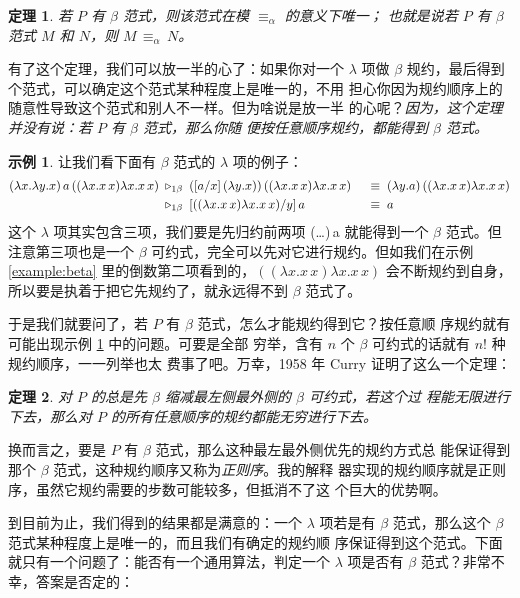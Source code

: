 \documentclass[a4paper,adobefonts]{ctexart}
\newtheorem{theorem}{定理}
\theoremstyle{definition}
\newtheorem{example}{示例}
\begin{document}
\begin{theorem}
  若 $P$ 有 $\beta$ 范式，则该范式在模 $\equiv_\alpha$ 的意义下唯一；
  也就是说若 $P$ 有 $\beta$ 范式 $M$ 和 $N$，则 $M\,\equiv_\alpha\,N$。
\end{theorem}

有了这个定理，我们可以放一半的心了：如果你对一个 $\lambda$ 项做
$\beta$ 规约，最后得到个范式，可以确定这个范式某种程度上是唯一的，不用
担心你因为规约顺序上的随意性导致这个范式和别人不一样。但为啥说是放一半
的心呢？\emph{因为，这个定理并没有说：若 $P$ 有 $\beta$ 范式，那么你随
  便按任意顺序规约，都能得到 $\beta$ 范式。}

\begin{example}\label{example:diffdiverge}
  让我们看下面有 $\beta$ 范式的 $\lambda$ 项的例子：
  \begin{alignat*}{2}
    (\lambda x.\lambda y. x)\,a\,((\lambda x.x\,x)\lambda x.x\,x)\; &\triangleright_{1\beta}\;
    ([a/x]\,(\lambda y.x))\,((\lambda x.x\,x)\lambda x.x\,x) &\; &\equiv\; (\lambda y.a)\,((\lambda x.x\,x)\lambda x.x\,x)\\
    &\triangleright_{1\beta}\; [((\lambda x.x\,x)\lambda x.x\,x)/y]\,a & &\equiv\; a
  \end{alignat*}
  这个 $\lambda$ 项其实包含三项，我们要是先归约前两项
  (\lambda\dots)\,a 就能得到一个 $\beta$ 范式。但注意第三项也是一个
  $\beta$ 可约式，完全可以先对它进行规约。但如我们在示例
  \ref{example:beta} 里的倒数第二项看到的，$((\lambda x.x\,x)\lambda
  x.x\,x)$ 会不断规约到自身，所以要是执着于把它先规约了，就永远得不到
  $\beta$ 范式了。
\end{example}

于是我们就要问了，若 $P$ 有 $\beta$ 范式，怎么才能规约得到它？按任意顺
序规约就有可能出现示例 \ref{example:diffdiverge} 中的问题。可要是全部
穷举，含有 $n$ 个 $\beta$ 可约式的话就有 $n!$ 种规约顺序，一一列举也太
费事了吧。万幸，1958 年 Curry 证明了这么一个定理：

\begin{theorem}
  对 $P$ 的总是先 $\beta$ 缩减最左侧最外侧的 $\beta$ 可约式，若这个过
  程能无限进行下去，那么对 $P$ 的所有任意顺序的规约都能无穷进行下去。
\end{theorem}

换而言之，要是 $P$ 有 $\beta$ 范式，那么这种最左最外侧优先的规约方式总
能保证得到那个 $\beta$ 范式，这种规约顺序又称为\emph{正则序}。我的解释
器实现的规约顺序就是正则序，虽然它规约需要的步数可能较多，但抵消不了这
个巨大的优势啊。

到目前为止，我们得到的结果都是满意的：一个 $\lambda$ 项若是有 $\beta$
范式，那么这个 $\beta$ 范式某种程度上是唯一的，而且我们有确定的规约顺
序保证得到这个范式。下面就只有一个问题了：能否有一个通用算法，判定一个
$\lambda$ 项是否有 $\beta$ 范式？非常不幸，答案是否定的：
\end{document}
